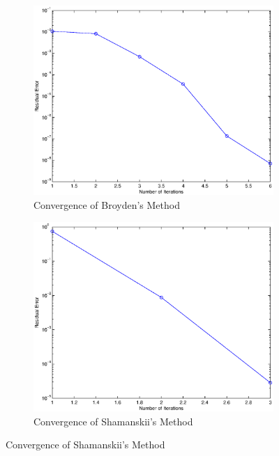 \documentclass[paper=a4, fontsize=11pt]{scrartcl} %
\numberwithin{equation}{section} %
\numberwithin{figure}{section} %
\numberwithin{table}{section} %
\begin{document}
\begin{figure}[H]
\begin{subfigure}{.5\textwidth}
\centering
\includegraphics [width = 1\linewidth] {broydenfig.eps}
\caption{Convergence of Broyden's Method}
\end{subfigure}
\begin{subfigure}{.5\textwidth}
\centering
\includegraphics [width = 1\linewidth] {shamfig.eps}
\caption{Convergence of Shamanskii's Method}
\end{subfigure}
\end{figure}
\end{document}
